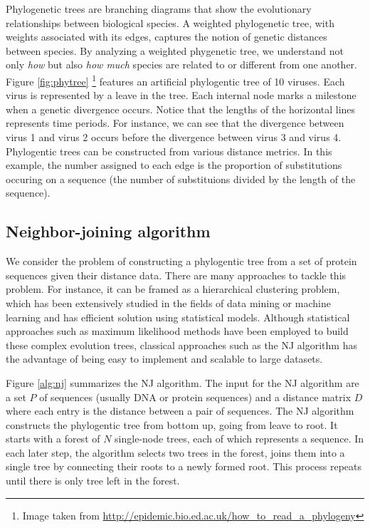 \documentclass[11pt,letterpaper]{article}
\theoremstyle{definition}
\begin{document}
Phylogenetic trees are branching diagrams that show the evolutionary relationships between biological species. A weighted phylogenetic tree, with weights associated with its edges, captures the notion of genetic distances between species. By analyzing a weighted phygenetic tree, we understand not only \textit{how} but also \textit{how much} species are related to or different from one another. Figure \ref{fig:phytree} \footnote{Image taken from \url{http://epidemic.bio.ed.ac.uk/how_to_read_a_phylogeny}} features an artificial phylogentic tree of 10 viruses. Each virus is represented by a leave in the tree. Each internal node marks a milestone when a genetic divergence occurs. Notice that the lengths of the horizontal lines represents time periods. For instance, we can see that the divergence between virus 1 and virus 2 occurs before the divergence between virus 3 and virus 4. Phylogentic trees can be constructed from various distance metrics. In this example, the number assigned to each edge is the proportion of substitutions occuring on a sequence (the number of substituions divided by the length of the sequence). 

\subsection{Neighbor-joining algorithm}

We consider the problem of constructing a phylogentic tree from a set of protein sequences given their distance data. There are many approaches to tackle this problem. For instance, it can be framed as a hierarchical clustering problem, which has been extensively studied in the fields of data mining or machine learning and has efficient solution using statistical models. Although statistical approaches such as maximum likelihood methods have been employed to build these complex evolution trees, classical approaches such as the NJ algorithm has the advantage of being easy to implement and scalable to large datasets. 

Figure \ref{alg:nj} summarizes the NJ algorithm. The input for the NJ algorithm are a set $P$ of sequences (usually DNA or protein sequences) and a distance matrix $D$ where each entry is the distance between a pair of sequences. The NJ algorithm constructs the phylogentic tree from bottom up, going from leave to root. It starts with a forest of $N$ single-node trees, each of which represents a sequence. In each later step, the algorithm selects two trees in the forest, joins them into a single tree by connecting their roots to a newly formed root. This process repeats until there is only tree left in the forest.
\end{document}
